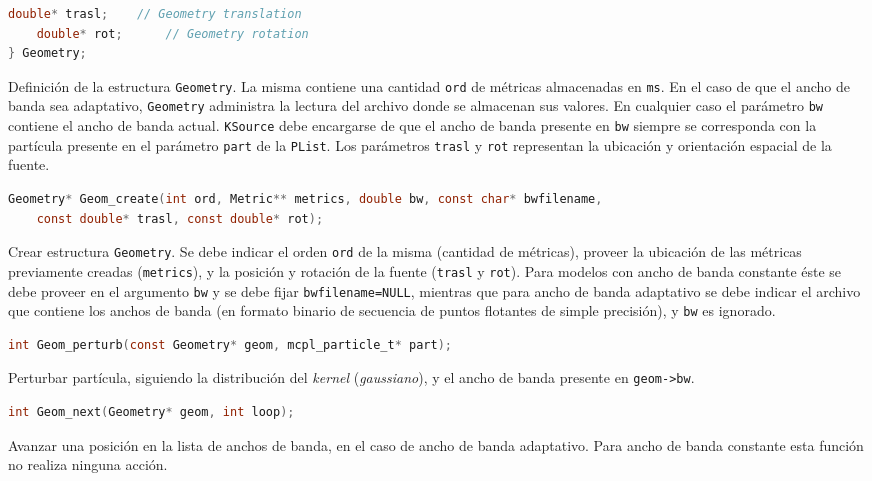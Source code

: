 \begin{footnotesize}
\begin{lstlisting}[language=C]
	double* trasl;    // Geometry translation
	double* rot;      // Geometry rotation
} Geometry;
\end{lstlisting}
\begin{addmargin}[0.5cm]{0cm}
Definición de la estructura \verb|Geometry|. La misma contiene una cantidad \verb|ord| de métricas almacenadas en \verb|ms|. En el caso de que el ancho de banda sea adaptativo, \verb|Geometry| administra la lectura del archivo donde se almacenan sus valores. En cualquier caso el parámetro \verb|bw| contiene el ancho de banda actual. \verb|KSource| debe encargarse de que el ancho de banda presente en \verb|bw| siempre se corresponda con la partícula presente en el parámetro \verb|part| de la \verb|PList|. Los parámetros \verb|trasl| y \verb|rot| representan la ubicación y orientación espacial de la fuente.
\end{addmargin}

\begin{lstlisting}[language=C]
Geometry* Geom_create(int ord, Metric** metrics, double bw, const char* bwfilename,
	const double* trasl, const double* rot);
\end{lstlisting}
\begin{addmargin}[0.5cm]{0cm}
Crear estructura \verb|Geometry|. Se debe indicar el orden \verb|ord| de la misma (cantidad de métricas), proveer la ubicación de las métricas previamente creadas (\verb|metrics|), y la posición y rotación de la fuente (\verb|trasl| y \verb|rot|). Para modelos con ancho de banda constante éste se debe proveer en el argumento \verb|bw| y se debe fijar \verb|bwfilename=NULL|, mientras que para ancho de banda adaptativo se debe indicar el archivo que contiene los anchos de banda (en formato binario de secuencia de puntos flotantes de simple precisión), y \verb|bw| es ignorado.
\end{addmargin}

\begin{lstlisting}[language=C]
int Geom_perturb(const Geometry* geom, mcpl_particle_t* part);
\end{lstlisting}
\begin{addmargin}[0.5cm]{0cm}
Perturbar partícula, siguiendo la distribución del \emph{kernel} (\emph{gaussiano}), y el ancho de banda presente en \verb|geom->bw|.
\end{addmargin}

\begin{lstlisting}[language=C]
int Geom_next(Geometry* geom, int loop);
\end{lstlisting}
\begin{addmargin}[0.5cm]{0cm}
Avanzar una posición en la lista de anchos de banda, en el caso de ancho de banda adaptativo. Para ancho de banda constante esta función no realiza ninguna acción.
\end{addmargin}


\end{footnotesize}
